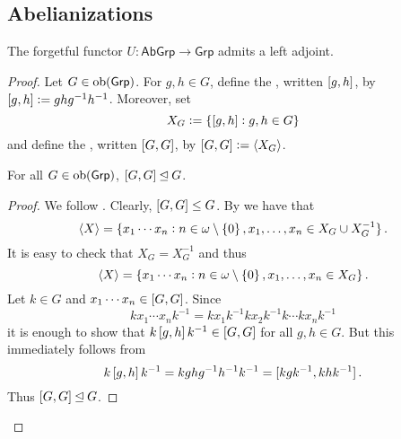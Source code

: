 \subsection*{Abelianizations}

\begin{proposition}
	The forgetful functor $U : \mathsf{AbGrp} \to \mathsf{Grp}$ admits a left adjoint.
	\label{prop:Ab_grp_abgrp}
\end{proposition}

\begin{proof}
	Let $G \in \operatorname{ob}(\mathsf{Grp})$. For $g,h \in G$, define the , written $\sbr[0]{g,h}$, by $\sbr[0]{g,h} := ghg^{-1}h^{-1}$. Moreover, set 
	\begin{equation*}
		X_G := \cbr[0]{\sbr[0]{g,h} : g,h \in G}
	\end{equation*}
	\noindent and define the , written $\sbr{G,G}$, by $\sbr{G,G} := \langle X_G \rangle$.

	\begin{lemma}
		For all $G \in \operatorname{ob}(\mathsf{Grp})$, $\sbr{G,G} \unlhd G$.
	\end{lemma}

	\begin{proof}
		We follow \cite[265]{lee:topological_manifolds:2011}. Clearly, $\sbr{G,G} \leq G$. By \cite[31]{karpfinger:algebra:2013} we have that 
	\begin{equation*}
		\langle X \rangle = \cbr[0]{x_1 \cdots x_n : n \in \omega \setminus \cbr{0}, x_1,\dots,x_n \in X_G \cup X^{-1}_G}.
	\end{equation*}
	It is easy to check that $X_G = X_G^{-1}$ and thus 
	\begin{equation*}
		\langle X \rangle = \cbr[0]{x_1 \cdots x_n : n \in \omega \setminus \cbr{0}, x_1,\dots,x_n \in X_G}.
	\end{equation*}
	Let $k \in G$ and $x_1 \cdots x_n \in \sbr{G,G}$. Since
	\begin{equation*}
		kx_1 \cdots x_n k^{-1} = kx_1 k^{-1} k x_2 k^{-1} k \cdots k x_n k^{-1}
	\end{equation*}
	\noindent it is enough to show that $k\sbr[0]{g,h}k^{-1} \in \sbr{G,G}$ for all $g,h \in G$. But this immediately follows from
	\begin{equation*}
		k\sbr[0]{g,h}k^{-1} = kghg^{-1}h^{-1}k^{-1} = \sbr[0]{kgk^{-1},khk^{-1}}.
	\end{equation*}
	Thus $\sbr{G,G} \unlhd G$.
	\end{proof}


\end{proof}
